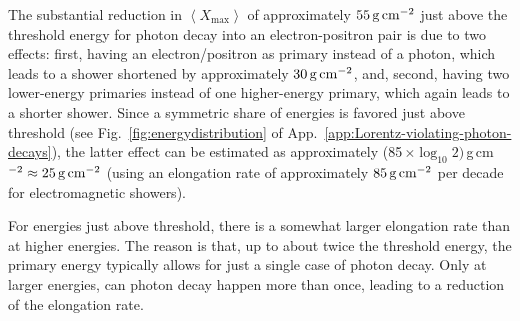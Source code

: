 \documentclass[aps,prd,preprint,longbibliography]{revtex4-1}
\begin{document}
The substantial reduction in $\left<X_\text{max}\right>$
of approximately $\unit[55]{g\,cm^{-2}}$ just above the threshold energy
for photon decay into an electron-positron pair is due to two effects:
first, having an electron/positron as primary instead of a photon,
which leads to a shower shortened by approximately $\unit[30]{g\,cm^{-2}}$,
and,
second, having two lower-energy primaries instead of one higher-energy
primary, which again leads to a shorter shower.
Since a symmetric share of energies is favored just above threshold
(see Fig.~\ref{fig:energydistribution} of
App.~\ref{app:Lorentz-violating-photon-decays}), the latter effect can be estimated as approximately
(85\,$\times \log_{10} 2)\,$g\,cm$^{-2} \approx \unit[25]{g\,cm^{-2}}$
(using an elongation rate of approximately
$\unit[85]{g\,cm^{-2}}$ per decade for electromagnetic showers).

For energies just above threshold, there is a somewhat
larger elongation rate than at higher energies.
The reason is that, up to about twice the threshold energy,
the primary energy typically allows for just a single case of photon decay.
Only at larger energies, can photon decay happen more than once, leading to a reduction of the elongation rate.
\end{document}
